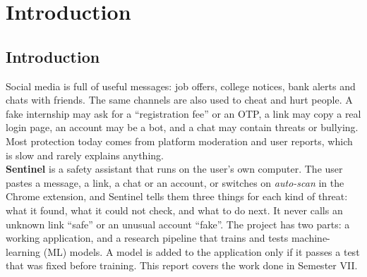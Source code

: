 \onehalfspacing

\pagestyle{fancy}
\fancyhf{}
\renewcommand{\headrulewidth}{0pt}
\cfoot{\thepage}
\chapter{Introduction}

\section{Introduction}
\noindent Social media is full of useful messages: job offers, college notices, bank alerts and chats with friends. The same channels are also used to cheat and hurt people. A fake internship may ask for a ``registration fee'' or an OTP, a link may copy a real login page, an account may be a bot, and a chat may contain threats or bullying. Most protection today comes from platform moderation and user reports, which is slow and rarely explains anything.\\

\noindent \textbf{Sentinel} is a safety assistant that runs on the user's own computer. The user pastes a message, a link, a chat or an account, or switches on \emph{auto-scan} in the Chrome extension, and Sentinel tells them three things for each kind of threat: what it found, what it could not check, and what to do next. It never calls an unknown link ``safe'' or an unusual account ``fake''. The project has two parts: a working application, and a research pipeline that trains and tests machine-learning (ML) models. A model is added to the application only if it passes a test that was fixed before training. This report covers the work done in Semester VII.

